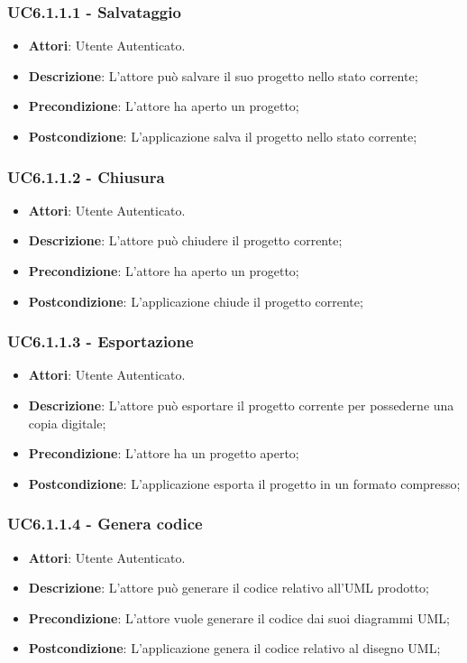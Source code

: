 \subsubsection{UC6.1.1.1 - Salvataggio} 
\label{sssec:UC6.1.1.1} 
\begin{itemize} 
\item \textbf{Attori}: Utente Autenticato.
\item \textbf{Descrizione}: L’attore può salvare il suo progetto nello stato corrente;
\item \textbf{Precondizione}: L’attore ha aperto un progetto;
\item \textbf{Postcondizione}: L’applicazione salva il progetto nello stato corrente;
\end{itemize} 
\subsubsection{UC6.1.1.2 - Chiusura} 
\label{sssec:UC6.1.1.2} 
\begin{itemize} 
\item \textbf{Attori}: Utente Autenticato.
\item \textbf{Descrizione}: L’attore può chiudere il progetto corrente;
\item \textbf{Precondizione}: L'attore ha aperto un progetto;
\item \textbf{Postcondizione}: L’applicazione chiude il progetto corrente;
\end{itemize} 
\subsubsection{UC6.1.1.3 - Esportazione} 
\label{sssec:UC6.1.1.3} 
\begin{itemize} 
\item \textbf{Attori}: Utente Autenticato.
\item \textbf{Descrizione}: L’attore può esportare il progetto corrente per possederne una copia digitale;
\item \textbf{Precondizione}: L’attore ha un progetto aperto;
\item \textbf{Postcondizione}: L’applicazione esporta il progetto in un formato compresso;
\end{itemize} 
\subsubsection{UC6.1.1.4 - Genera codice} 
\label{sssec:UC6.1.1.4} 
\begin{itemize} 
\item \textbf{Attori}: Utente Autenticato.
\item \textbf{Descrizione}: L’attore può generare il codice relativo all’UML prodotto;
\item \textbf{Precondizione}: L’attore vuole generare il codice dai suoi diagrammi UML;
\item \textbf{Postcondizione}: L’applicazione genera il codice relativo al disegno UML;
\end{itemize} 

